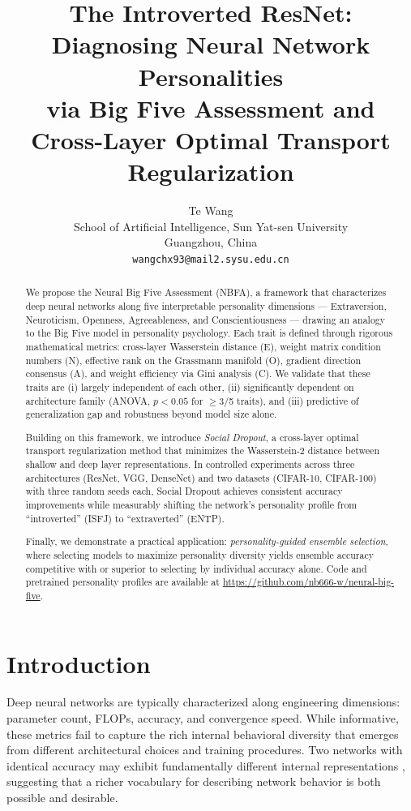 \documentclass[letterpaper]{article}
\title{\Large \textbf{The Introverted ResNet: Diagnosing Neural Network Personalities \\
via Big Five Assessment and Cross-Layer Optimal Transport Regularization}}
\author{
Te Wang \\
School of Artificial Intelligence, Sun Yat-sen University \\
Guangzhou, China \\
\texttt{wangchx93@mail2.sysu.edu.cn}
}
\date{}
\begin{document}
\maketitle

\begin{abstract}
We propose the Neural Big Five Assessment (NBFA), a framework that characterizes deep neural networks along five interpretable personality dimensions — Extraversion, Neuroticism, Openness, Agreeableness, and Conscientiousness — drawing an analogy to the Big Five model in personality psychology. Each trait is defined through rigorous mathematical metrics: cross-layer Wasserstein distance (E), weight matrix condition numbers (N), effective rank on the Grassmann manifold (O), gradient direction consensus (A), and weight efficiency via Gini analysis (C). We validate that these traits are (i) largely independent of each other, (ii) significantly dependent on architecture family (ANOVA, $p < 0.05$ for $\geq$3/5 traits), and (iii) predictive of generalization gap and robustness beyond model size alone. 

Building on this framework, we introduce \emph{Social Dropout}, a cross-layer optimal transport regularization method that minimizes the Wasserstein-2 distance between shallow and deep layer representations. In controlled experiments across three architectures (ResNet, VGG, DenseNet) and two datasets (CIFAR-10, CIFAR-100) with three random seeds each, Social Dropout achieves consistent accuracy improvements while measurably shifting the network's personality profile from ``introverted'' (ISFJ) to ``extraverted'' (ENTP). 

Finally, we demonstrate a practical application: \emph{personality-guided ensemble selection}, where selecting models to maximize personality diversity yields ensemble accuracy competitive with or superior to selecting by individual accuracy alone. Code and pretrained personality profiles are available at \url{https://github.com/nb666-w/neural-big-five}.
\end{abstract}

\section{Introduction}
\label{sec:intro}

Deep neural networks are typically characterized along engineering dimensions: parameter count, FLOPs, accuracy, and convergence speed. While informative, these metrics fail to capture the rich internal behavioral diversity that emerges from different architectural choices and training procedures. Two networks with identical accuracy may exhibit fundamentally different internal representations \citep{kornblith2019similarity, raghu2017svcca}, suggesting that a richer vocabulary for describing network behavior is both possible and desirable.
\end{document}
